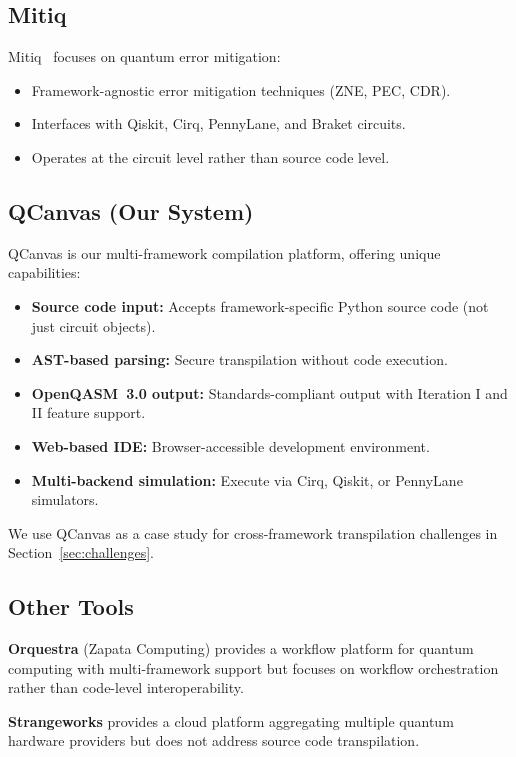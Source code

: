 \documentclass[journal]{IEEEtran}
\begin{document}
\subsection{Mitiq}

Mitiq~\cite{larose2022mitiq} focuses on quantum error mitigation:
\begin{itemize}
    \item Framework-agnostic error mitigation techniques (ZNE, PEC, CDR).
    \item Interfaces with Qiskit, Cirq, PennyLane, and Braket circuits.
    \item Operates at the circuit level rather than source code level.
\end{itemize}

\subsection{QCanvas (Our System)}

QCanvas is our multi-framework compilation platform, offering unique capabilities:
\begin{itemize}
    \item \textbf{Source code input:} Accepts framework-specific Python source code (not just circuit objects).
    \item \textbf{AST-based parsing:} Secure transpilation without code execution.
    \item \textbf{OpenQASM~3.0 output:} Standards-compliant output with Iteration I and II feature support.
    \item \textbf{Web-based IDE:} Browser-accessible development environment.
    \item \textbf{Multi-backend simulation:} Execute via Cirq, Qiskit, or PennyLane simulators.
\end{itemize}

We use QCanvas as a case study for cross-framework transpilation challenges in Section~\ref{sec:challenges}.

\subsection{Other Tools}

\textbf{Orquestra} (Zapata Computing) provides a workflow platform for quantum computing with multi-framework support but focuses on workflow orchestration rather than code-level interoperability.

\textbf{Strangeworks} provides a cloud platform aggregating multiple quantum hardware providers but does not address source code transpilation.
\end{document}
